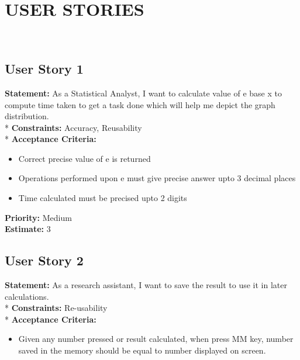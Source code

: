 \documentclass[12pt]{article}
\begin{document}
\section*{USER STORIES} \\  %

\subsection{User Story 1} %
\noindent \textbf {Statement: }As a Statistical Analyst, I want to calculate value of e base x to compute time taken to get a task done which will help me depict the graph distribution. \\*
\newline 
\noindent \textbf {Constraints:}  Accuracy, Reusability\\*
\newline
\textbf{Acceptance Criteria: } 
\begin{itemize}
\item Correct precise value of e is returned
\item Operations performed upon e must give precise answer upto 3 decimal places
  \item Time calculated must be precised upto 2 digits
\end{itemize}

\noindent \textbf {Priority: }Medium\\[0.4cm]
\newline
\noindent \textbf {Estimate: } 3
\newline





\newpage
\subsection{User Story 2} %

\noindent \textbf {Statement: }As a research assistant, I want to save the result to use it in later calculations. \\*
\newline 
\noindent \textbf {Constraints:}  Re-usability\\*
\newline
\textbf{Acceptance Criteria: } 
\begin{itemize}
  \item Given any number pressed or result calculated, when press MM key, number saved in the memory should be equal to number displayed on screen.\newline

\end{itemize}
\end{document}
